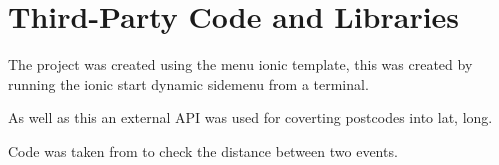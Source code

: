 \chapter{Third-Party Code and Libraries}

The project was created using the menu ionic template, this was created by running the ionic start dynamic sidemenu from a terminal.\cite{ionictemplate} 

As well as this an external API was used for coverting postcodes into lat, long. \cite{postcode}

Code was taken from \cite{latlong} to check the distance between two events.